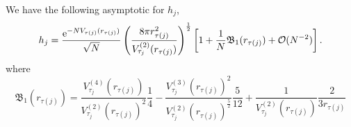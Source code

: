 \begin{teorema}
	We have the following asymptotic for $h_j$,
	\begin{equation}
		h_j = \frac{\operatorname{e}^{-N V_{\tau(j)}(r_{\tau(j)})}}{\sqrt{N}} \left( \frac{8\pi r_{\tau(j)}^2}{V^{(2)}_{\tau_j}(r_{\tau(j)})} \right)^{\frac{1}{2}} \left[ 1 + \frac{1}{N} \mathfrak{B}_1(r_{\tau(j)}) + \mathcal{O}(N^{-2}) \right].
		\label{Equation: Asymptotic hj annulus}
	\end{equation}
	where
	\begin{equation}
	\mathfrak{B}_1(r_{\tau(j)})  = \frac{V^{(4)}_{\tau_j}(r_{\tau(j)})}{V^{(2)}_{\tau_j}(r_{\tau(j)})^2} \frac{1}{4} - \frac{V^{(3)}_{\tau_j}(r_{\tau(j)})^2}{V^{(2)}_{\tau_j}(r_{\tau(j)})^{\frac{5}{2}}} \frac{5}{12} + \frac{1}{V^{(2)}_{\tau_j}(r_{\tau(j)})} \frac{2}{3 r_{\tau(j)}}
	\end{equation}
\end{teorema}
